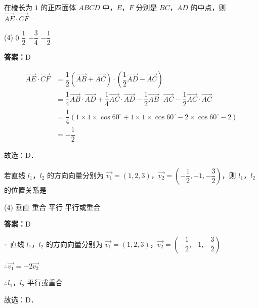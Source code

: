 \vspace{2em}


\begin{example}[\bkstar{3}{5}]
在棱长为 $1$ 的正四面体 $ABCD$ 中，$E$，$F$ 分别是 $BC$，$AD$ 的中点，则 $\overrightarrow{AE}\cdot\overrightarrow{CF}=$
\begin{tasks}(4)
    \task $0$
    \task $\dfrac{1}{2}$
    \task $-\dfrac{3}{4}$
    \task $-\dfrac{1}{2}$
\end{tasks}
\end{example}
\begin{solution}
\textbf{答案：}D

\begin{align*}
\overrightarrow{AE}\cdot\overrightarrow{CF}&=\dfrac{1}{2}\left(\overrightarrow{AB}+\overrightarrow{AC}\right)\cdot\left(\dfrac{1}{2}\overrightarrow{AD}-\overrightarrow{AC}\right)\\
&=\dfrac{1}{4}\overrightarrow{AB}\cdot\overrightarrow{AD}+\dfrac{1}{4}\overrightarrow{AC}\cdot\overrightarrow{AD}-\dfrac{1}{2}\overrightarrow{AB}\cdot\overrightarrow{AC}-\dfrac{1}{2}\overrightarrow{AC}\cdot\overrightarrow{AC}\\
&=\dfrac{1}{4}\left(1\times1\times\cos60^{\circ}+1\times1\times\cos60^{\circ}-2\times\cos60^{\circ}-2\right)\\
&=-\dfrac{1}{2}
\end{align*}

故选：D．
\end{solution}

\vspace{2em}


\begin{example}[\bkstar{2}{5}]
若直线 $l_1$，$l_2$ 的方向向量分别为 $\overrightarrow{v_1}=(1,2,3)$，$\overrightarrow{v_2}=\left(-\dfrac{1}{2},-1,-\dfrac{3}{2}\right)$，则 $l_1$，$l_2$ 的位置关系是
\begin{tasks}(4)
    \task 垂直
    \task 重合
    \task 平行
    \task 平行或重合
\end{tasks}
\end{example}
\begin{solution}
\textbf{答案：}D

$\because$ 直线 $l_1$，$l_2$ 的方向向量分别为 $\overrightarrow{v_1}=(1,2,3)$，$\overrightarrow{v_2}=\left(-\dfrac{1}{2},-1,-\dfrac{3}{2}\right)$

$\therefore \overrightarrow{v_1}=-2\overrightarrow{v_2}$

$\therefore l_1$，$l_2$ 平行或重合

故选：D．
\end{solution}

